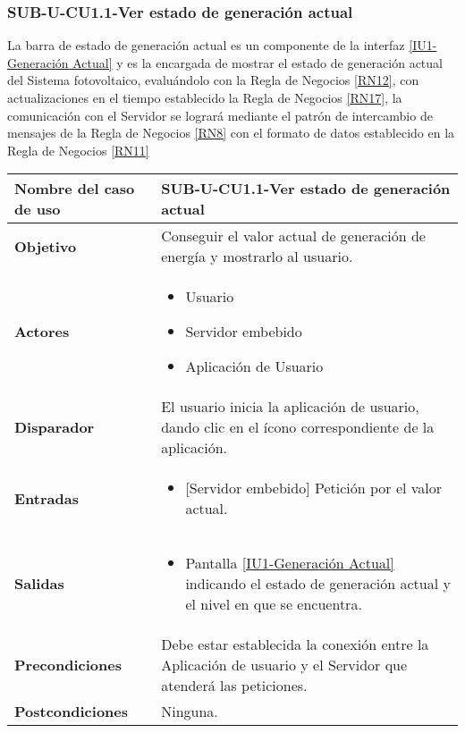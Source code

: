 \subsubsection{SUB-U-CU1.1-Ver estado de generación actual}\label{SUB-U-CU1.1}
La barra de estado de generación actual es un componente de la interfaz \hyperref[fig:monitoreo]{[IU1-Generación Actual]} y es la encargada de mostrar el estado de generación actual del Sistema fotovoltaico, evaluándolo con la Regla de Negocios \ref{RN12}, con actualizaciones en el tiempo establecido la Regla de Negocios \ref{RN17}, la comunicación con el Servidor se logrará mediante el patrón de intercambio de mensajes de la Regla de Negocios \ref{RN8} con el formato de datos establecido en la Regla de Negocios \ref{RN11}   
\begin{longtable}{|J{5cm}|J{10.3cm}|}
	\hline
	\textbf{Nombre del caso de uso} &
		SUB-U-CU1.1-Ver estado de generación actual \\ \hline
	\textbf{Objetivo} &
		Conseguir el valor actual de generación de energía y mostrarlo al usuario. \\ \hline
	\textbf{Actores} &
		\begin{itemize}
		    \item Usuario
			\item Servidor embebido
			\item Aplicación de Usuario
		\end{itemize} \\ \hline
	\textbf{Disparador} & 
	    El usuario inicia la aplicación de usuario, dando clic en el ícono correspondiente de la aplicación.\\ \hline 
	\textbf{Entradas} & 
		\begin{itemize}
				\item{[Servidor embebido]} Petición por el valor actual.
		\end{itemize}\\ \hline 
	\textbf{Salidas} & 
		\begin{itemize}
			\item Pantalla \hyperref[fig:monitoreo]{[IU1-Generación Actual]} indicando el estado de generación actual y el nivel en que se encuentra.
		\end{itemize} \\ \hline
	\textbf{Precondiciones} &
		Debe estar establecida la conexión entre la Aplicación de usuario y el Servidor que atenderá las peticiones. \\ \hline
	\textbf{Postcondiciones} &
		Ninguna.\\ \hline

\end{longtable}
